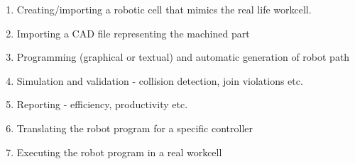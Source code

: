 \begin{enumerate}
  \item Creating/importing a robotic cell that mimics the real life workcell. 
  \item Importing a CAD file representing the machined part
  \item Programming (graphical or textual) and automatic generation of robot path
  \item Simulation and validation - collision detection, join violations etc.
  \item Reporting - efficiency, productivity etc.
  \item Translating the robot program for a specific controller 
  \item Executing the robot program in a real workcell
\end{enumerate}
